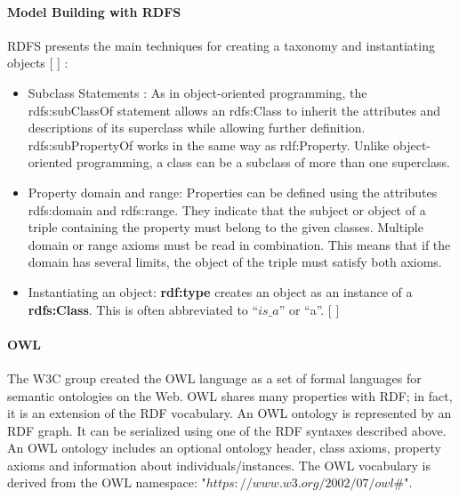                 
        
        
        

            \paragraph{Model Building with RDFS}
            RDFS presents the main techniques for creating a taxonomy and instantiating objects [ ] : 

            \begin{itemize}
                \item Subclass Statements : As in object-oriented programming, the rdfs:subClassOf statement allows an rdfs:Class to inherit the attributes and descriptions of its superclass while allowing further definition. rdfs:subPropertyOf works in the same way as rdf:Property. Unlike object-oriented programming, a class can be a subclass of more than one superclass. 
                \item Property domain and range: Properties can be defined using the attributes rdfs:domain and rdfs:range. They indicate that the subject or object of a triple containing the property must belong to the given classes. Multiple domain or range axioms must be read in combination. This means that if the domain has several limits, the object of the triple must satisfy both axioms. 
                \item Instantiating an object: \textbf{rdf:type} creates an object as an instance of a \textbf{rdfs:Class}. This is often abbreviated to “$is\_a$” or “a”. [ ] 
            \end{itemize}
    
            \paragraph{OWL}
            The W3C group created the OWL language as a set of formal languages for semantic ontologies on the Web. OWL shares many properties with RDF; in fact, it is an extension of the RDF vocabulary. An OWL ontology is represented by an RDF graph. It can be serialized using one of the RDF syntaxes described above. \\
        
            An OWL ontology includes an optional ontology header, class axioms, property axioms and information about individuals/instances. The OWL vocabulary is derived from the OWL namespace: "$https://www.w3.org/2002/07/owl\#$". 
        
